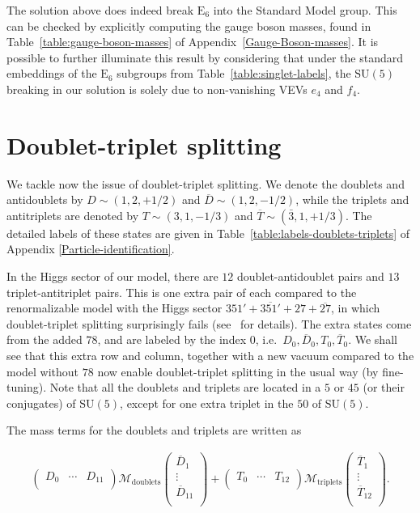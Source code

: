 \documentclass[a4paper,12pt]{article}
\def\SU{\mathrm{SU}}
\def\EE{\mathrm{E}_6}
\begin{document}
The solution above does indeed break $\EE$ into the Standard Model group. This can be checked by explicitly computing the gauge boson masses, found in Table~\ref{table:gauge-boson-masses} of Appendix~\ref{Gauge-Boson-masses}. It is possible to further illuminate this result by considering that under the standard embeddings of the $\EE$ subgroups from Table~\ref{table:singlet-labels}, the $\SU(5)$ breaking in our solution is solely due to non-vanishing VEVs $e_4$ and $f_4$.


\section{Doublet-triplet splitting\label{section:DT-splitting}}

We tackle now the issue of doublet-triplet splitting. We denote the doublets and antidoublets by $D\sim (1,2,+1/2)$ and $\overline{D}\sim (1,2,-1/2)$, while the triplets and antitriplets are denoted by $T\sim (3,1,-1/3)$ and $\overline{T}\sim (\bar{3},1,+1/3)$. The detailed labels of these states are given in Table~\ref{table:labels-doublets-triplets} of Appendix \ref{Particle-identification}.

In the Higgs sector of our model, there are $12$ doublet-antidoublet pairs and $13$ triplet-antitriplet pairs. This is one extra pair of each compared to the renormalizable model with the Higgs sector $351'+\overline{351'}+27+\overline{27}$, in which doublet-triplet splitting surprisingly fails (see~\cite{Bajc:2013qra} for details). The extra states come from the added $78$, and are labeled by the index $0$, i.e.~$D_0,\overline{D}_0,T_0,\overline{T}_0$. We shall see that  this extra row and column, together with a new vacuum compared to the model without $78$ now enable doublet-triplet splitting in the usual way (by fine-tuning). Note that all the doublets and triplets are located in a $5$ or $45$ (or their conjugates) of $\SU(5)$, except for one extra triplet in the $50$ of $\SU(5)$.

The mass terms for the doublets and triplets are written as

\begin{align}
\begin{pmatrix}D_0&\cdots& D_{11}\\\end{pmatrix}
 \mathcal{M}_{\textrm{doublets}}
\begin{pmatrix}\overline{D}_1\\\vdots \\\overline{D}_{11}\\\end{pmatrix}+
\begin{pmatrix}T_0&\cdots& T_{12}\\\end{pmatrix}
 \mathcal{M}_{\textrm{triplets}}
\begin{pmatrix}\overline{T}_1\\\vdots \\\overline{T}_{12}\\\end{pmatrix}.
\end{align}
\end{document}
